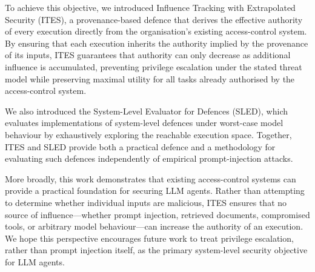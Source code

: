 \documentclass{article} %
\begin{document}
To achieve this objective, we introduced Influence Tracking with Extrapolated Security (ITES), a provenance-based defence that derives the effective authority of every execution directly from the organisation's existing access-control system. By ensuring that each execution inherits the authority implied by the provenance of its inputs, ITES guarantees that authority can only decrease as additional influence is accumulated, preventing privilege escalation under the stated threat model while preserving maximal utility for all tasks already authorised by the access-control system.

We also introduced the System-Level Evaluator for Defences (SLED), which evaluates implementations of system-level defences under worst-case model behaviour by exhaustively exploring the reachable execution space. Together, ITES and SLED provide both a practical defence and a methodology for evaluating such defences independently of empirical prompt-injection attacks.

More broadly, this work demonstrates that existing access-control systems can provide a practical foundation for securing LLM agents. Rather than attempting to determine whether individual inputs are malicious, ITES ensures that no source of influence—whether prompt injection, retrieved documents, compromised tools, or arbitrary model behaviour—can increase the authority of an execution. We hope this perspective encourages future work to treat privilege escalation, rather than prompt injection itself, as the primary system-level security objective for LLM agents.













\end{document}
